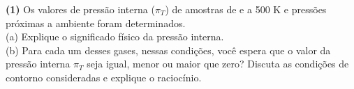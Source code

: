\textbf{(1)} Os valores de pressão interna (\(\pi_T\)) de amostras de  e
 a 500 K e pressões próximas a ambiente foram determinados.\\

(a) Explique o significado físico da pressão interna.\\

(b) Para cada um desses gases, nessas condições, você espera que o valor da
pressão interna \(\pi_T\)  seja igual, menor ou maior que zero? Discuta as
condições de contorno consideradas e explique o raciocínio.\\
